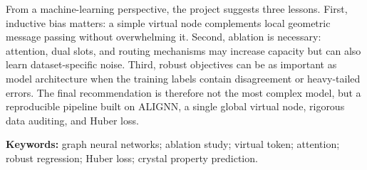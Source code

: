 \documentclass[11pt,a4paper]{article}
\begin{document}
From a machine-learning perspective, the project suggests three lessons. First, inductive bias matters: a simple virtual node complements local geometric message passing without overwhelming it. Second, ablation is necessary: attention, dual slots, and routing mechanisms may increase capacity but can also learn dataset-specific noise. Third, robust objectives can be as important as model architecture when the training labels contain disagreement or heavy-tailed errors. The final recommendation is therefore not the most complex model, but a reproducible pipeline built on ALIGNN, a single global virtual node, rigorous data auditing, and Huber loss.

\textbf{Keywords:} graph neural networks; ablation study; virtual token; attention; robust regression; Huber loss; crystal property prediction.
\end{document}
